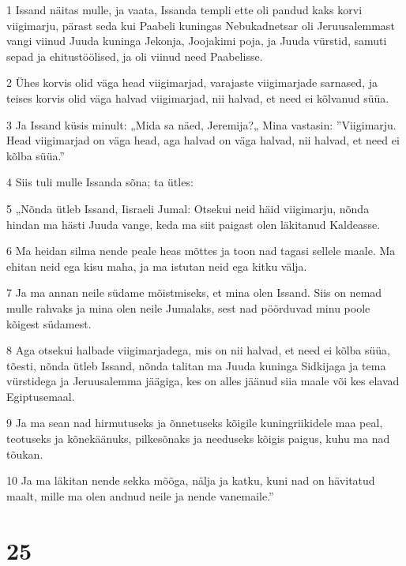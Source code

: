 \par 1 Issand näitas mulle, ja vaata, Issanda templi ette oli pandud kaks korvi viigimarju, pärast seda kui Paabeli kuningas Nebukadnetsar oli Jeruusalemmast vangi viinud Juuda kuninga Jekonja, Joojakimi poja, ja Juuda vürstid, samuti sepad ja ehitustöölised, ja oli viinud need Paabelisse.
\par 2 Ühes korvis olid väga head viigimarjad, varajaste viigimarjade sarnased, ja teises korvis olid väga halvad viigimarjad, nii halvad, et need ei kõlvanud süüa.
\par 3 Ja Issand küsis minult: „Mida sa näed, Jeremija?„ Mina vastasin: ”Viigimarju. Head viigimarjad on väga head, aga halvad on väga halvad, nii halvad, et need ei kõlba süüa.”
\par 4 Siis tuli mulle Issanda sõna; ta ütles:
\par 5 „Nõnda ütleb Issand, Iisraeli Jumal: Otsekui neid häid viigimarju, nõnda hindan ma hästi Juuda vange, keda ma siit paigast olen läkitanud Kaldeasse.
\par 6 Ma heidan silma nende peale heas mõttes ja toon nad tagasi sellele maale. Ma ehitan neid ega kisu maha, ja ma istutan neid ega kitku välja.
\par 7 Ja ma annan neile südame mõistmiseks, et mina olen Issand. Siis on nemad mulle rahvaks ja mina olen neile Jumalaks, sest nad pöörduvad minu poole kõigest südamest.
\par 8 Aga otsekui halbade viigimarjadega, mis on nii halvad, et need ei kõlba süüa, tõesti, nõnda ütleb Issand, nõnda talitan ma Juuda kuninga Sidkijaga ja tema vürstidega ja Jeruusalemma jäägiga, kes on alles jäänud siia maale või kes elavad Egiptusemaal.
\par 9 Ja ma sean nad hirmutuseks ja õnnetuseks kõigile kuningriikidele maa peal, teotuseks ja kõnekäänuks, pilkesõnaks ja needuseks kõigis paigus, kuhu ma nad tõukan.
\par 10 Ja ma läkitan nende sekka mõõga, nälja ja katku, kuni nad on hävitatud maalt, mille ma olen andnud neile ja nende vanemaile.”

\chapter{25}

